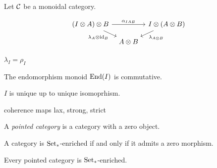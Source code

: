 \documentclass{../../large}
\begin{document}
\begin{prb}
Let $\mathcal{C}$ be a monoidal category.
\begin{parts}
\item
\[\begin{tikzcd}[row sep=small,column sep=tiny]
(I\otimes A)\otimes B \ar{rr}{\alpha_{IAB}} \ar[swap]{dr}{\lambda_A\otimes\id_B} &&
I\otimes(A\otimes B) \ar{dl}{\lambda_{A\otimes B}}\\
& A\otimes B &
\end{tikzcd}\]
\item $\lambda_I=\rho_I$
\item The endomorphism monoid $\operatorname{End}(I)$ is commutative.
\item $I$ is unique up to unique isomoprhism.
\end{parts}
\end{prb}

\begin{prb}
\end{prb}

\begin{prb}
coherence maps
lax, strong, strict
\end{prb}





\begin{prb}
A \emph{pointed category} is a category with a zero object.
\begin{parts}
\item A category is $\operatorname{Set}_*$-enriched if and only if it admits a zero morphism.
\item Every pointed category is $\operatorname{Set}_*$-enriched.
\end{parts}
\end{prb}



\section{}
\end{document}
